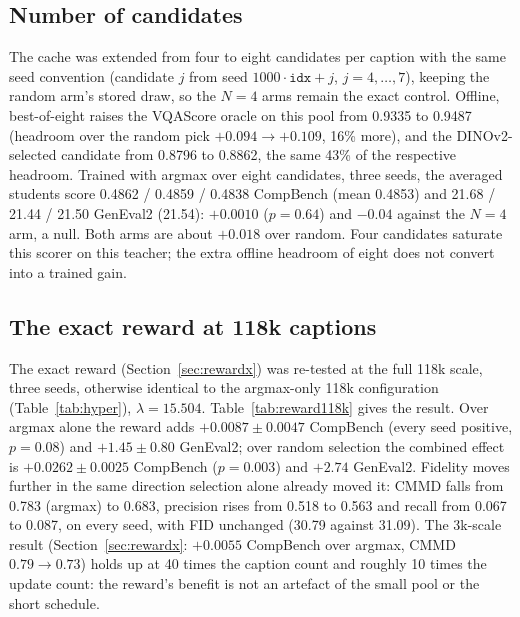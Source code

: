\documentclass[11pt,a4paper]{article}
\begin{document}
\subsection{Number of candidates}
\label{sec:n8}
The cache was extended from four to eight candidates per caption with the same seed convention (candidate $j$ from seed $1000\cdot\texttt{idx}+j$, $j=4,\dots,7$), keeping the random arm's stored draw, so the $N=4$ arms remain the exact control. Offline, best-of-eight raises the VQAScore oracle on this pool from 0.9335 to 0.9487 (headroom over the random pick $+0.094\to+0.109$, 16\% more), and the DINOv2-selected candidate from 0.8796 to 0.8862, the same 43\% of the respective headroom. Trained with argmax over eight candidates, three seeds, the averaged students score 0.4862 / 0.4859 / 0.4838 CompBench (mean 0.4853) and 21.68 / 21.44 / 21.50 GenEval2 (21.54): $+0.0010$ ($p=0.64$) and $-0.04$ against the $N=4$ arm, a null. Both arms are about $+0.018$ over random. Four candidates saturate this scorer on this teacher; the extra offline headroom of eight does not convert into a trained gain.

\subsection{The exact reward at 118k captions}
\label{sec:reward118k}
The exact reward (Section~\ref{sec:rewardx}) was re-tested at the full 118k scale, three seeds, otherwise identical to the argmax-only 118k configuration (Table~\ref{tab:hyper}), $\lambda=15.504$. Table~\ref{tab:reward118k} gives the result. Over argmax alone the reward adds $+0.0087\pm0.0047$ CompBench (every seed positive, $p=0.08$) and $+1.45\pm0.80$ GenEval2; over random selection the combined effect is $+0.0262\pm0.0025$ CompBench ($p=0.003$) and $+2.74$ GenEval2. Fidelity moves further in the same direction selection alone already moved it: CMMD falls from 0.783 (argmax) to 0.683, precision rises from 0.518 to 0.563 and recall from 0.067 to 0.087, on every seed, with FID unchanged (30.79 against 31.09). The 3k-scale result (Section~\ref{sec:rewardx}: $+0.0055$ CompBench over argmax, CMMD $0.79\to0.73$) holds up at 40 times the caption count and roughly 10 times the update count: the reward's benefit is not an artefact of the small pool or the short schedule.
\end{document}
